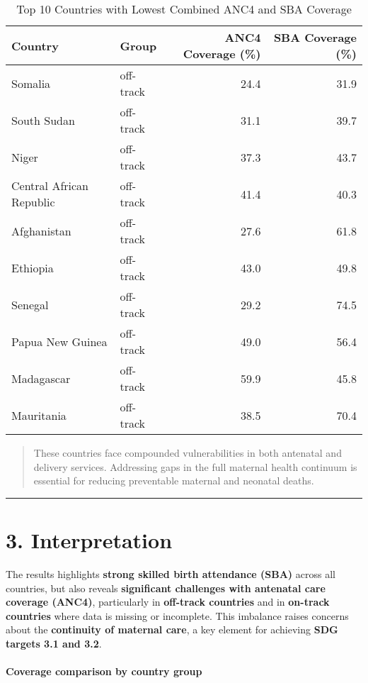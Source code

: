 \documentclass[
]{article}
\begin{document}
\begin{longtable}[t]{llrr}
\caption{\label{tab:unnamed-chunk-4}Top 10 Countries with Lowest Combined ANC4 and SBA Coverage}\\
\toprule
Country & Group & ANC4 Coverage (\%) & SBA Coverage (\%)\\
\midrule
Somalia & off-track & 24.4 & 31.9\\
South Sudan & off-track & 31.1 & 39.7\\
Niger & off-track & 37.3 & 43.7\\
Central African Republic & off-track & 41.4 & 40.3\\
Afghanistan & off-track & 27.6 & 61.8\\
\addlinespace
Ethiopia & off-track & 43.0 & 49.8\\
Senegal & off-track & 29.2 & 74.5\\
Papua New Guinea & off-track & 49.0 & 56.4\\
Madagascar & off-track & 59.9 & 45.8\\
Mauritania & off-track & 38.5 & 70.4\\
\bottomrule
\end{longtable}

\begin{quote}
These countries face compounded vulnerabilities in both antenatal and
delivery services. Addressing gaps in the full maternal health continuum
is essential for reducing preventable maternal and neonatal deaths.
\end{quote}

\begin{center}\rule{0.5\linewidth}{0.5pt}\end{center}

\section{3. Interpretation}\label{interpretation}

The results highlights \textbf{strong skilled birth attendance (SBA)}
across all countries, but also reveals \textbf{significant challenges
with antenatal care coverage (ANC4)}, particularly in \textbf{off-track
countries} and in \textbf{on-track countries} where data is missing or
incomplete. This imbalance raises concerns about the \textbf{continuity
of maternal care}, a key element for achieving \textbf{SDG targets 3.1
and 3.2}.

\paragraph{\texorpdfstring{\textbf{Coverage comparison by country
group}}{Coverage comparison by country group}}\label{coverage-comparison-by-country-group}
\end{document}
